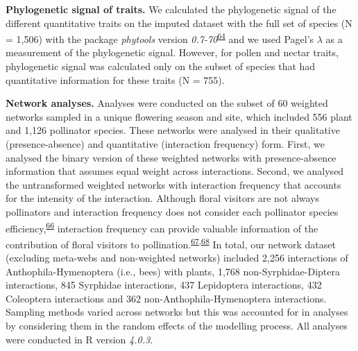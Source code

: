 \documentclass[
  12pt,
  a4paper,
]{article}
\begin{document}
\textbf{Phylogenetic signal of traits.} We calculated the phylogenetic signal of the different quantitative traits on the imputed dataset with the full set of species (N = 1,506) with the package \emph{phytools} version \emph{0.7-70}\textsuperscript{\protect\hyperlink{ref-revell2012}{64}} and we used Pagel's \(\lambda\) as a measurement of the phylogenetic signal. However, for pollen and nectar traits, phylogenetic signal was calculated only on the subset of species that had quantitative information for these traits (N = 755).

\textbf{Network analyses.} Analyses were conducted on the subset of 60 weighted networks sampled in a unique flowering season and site, which included 556 plant and 1,126 pollinator species. These networks were analysed in their qualitative (presence-absence) and quantitative (interaction frequency) form. First, we analysed the binary version of these weighted networks with presence-absence information that assumes equal weight across interactions. Second, we analysed the untransformed weighted networks with interaction frequency that accounts for the intensity of the interaction. Although floral visitors are not always pollinators and interaction frequency does not consider each pollinator species efficiency,\textsuperscript{\protect\hyperlink{ref-ballantyne2015}{66}} interaction frequency can provide valuable information of the contribution of floral visitors to pollination.\textsuperscript{\protect\hyperlink{ref-vazquez2005}{67},\protect\hyperlink{ref-vazquez2012}{68}} In total, our network dataset (excluding meta-webs and non-weighted networks) included 2,256 interactions of Anthophila-Hymenoptera (i.e., bees) with plants, 1,768 non-Syrphidae-Diptera interactions, 845 Syrphidae interactions, 437 Lepidoptera interactions, 432 Coleoptera interactions and 362 non-Anthophila-Hymenoptera interactions. Sampling methods varied across networks but this was accounted for in analyses by considering them in the random effects of the modelling process. All analyses were conducted in R version \emph{4.0.3}.
\end{document}
